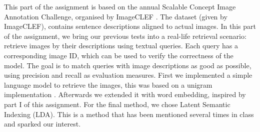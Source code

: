 This part of the assignment is based on the annual Scalable Concept Image Annotation Challenge, organised by ImageCLEF \cite{imageclef}. The dataset (given by ImageCLEF), contains sentence descriptions aligned to actual images. In this part of the assignment, we bring our previous tests into a real-life retrieval scenario: retrieve images by their descriptions using textual queries. Each query has a corresponding image ID, which can be used to verify the correctness of the model. The goal is to match queries with image descriptions as good as possible, using precision and recall as evaluation measures.
\newline
\newline
First we implemented a simple language model to retrieve the images, this was based on a unigram implementation \cite{languagemodelsforinformationretrieval}. Afterwards we extended it with word embedding, inspired by part I of this assignment. For the final method, we chose Latent Semantic Indexing (LDA). This is a method that has been mentioned several times in class and sparked our interest.
